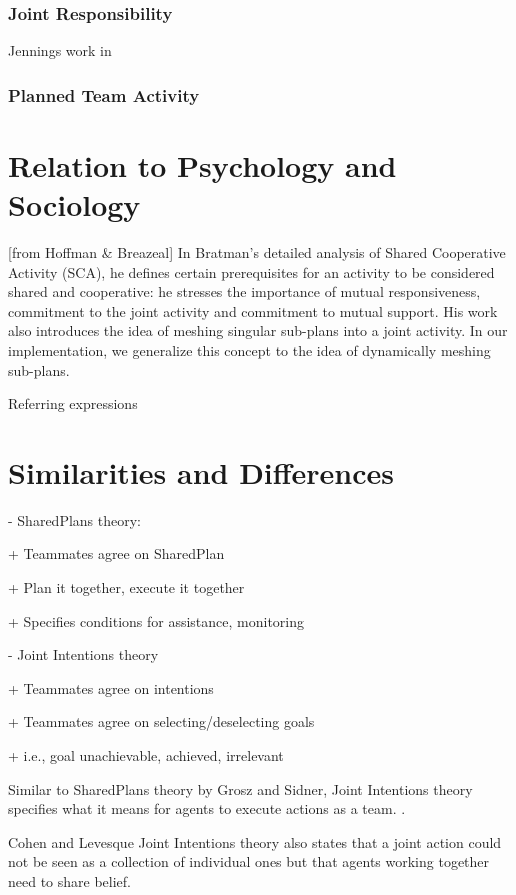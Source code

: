 \documentclass[11pt]{article}
\begin{document}
\subsubsection{Joint Responsibility}

Jennings work in \cite{jennings:joint-intention-hybrid}

\subsubsection{Planned Team Activity}

\section{Relation to Psychology and Sociology}

[from Hoffman \& Breazeal] In Bratman’s detailed analysis of Shared Cooperative
Activity (SCA), he defines certain prerequisites for an activity to be
considered shared and cooperative: he stresses the importance of mutual
responsiveness, commitment to the joint activity and commitment to mutual
support. His work also introduces the idea of meshing singular sub-plans into a
joint activity. In our implementation, we generalize this concept to the idea of
dynamically meshing sub-plans.

Referring expressions \cite{heeman:model-collaboration-referring}

\section{Similarities and Differences}

- SharedPlans theory:

+ Teammates agree on SharedPlan

+ Plan it together, execute it together

+ Specifies conditions for assistance, monitoring

- Joint Intentions theory

+ Teammates agree on intentions

+ Teammates agree on selecting/deselecting goals

+ i.e., goal unachievable, achieved, irrelevant

Similar to SharedPlans theory by Grosz and Sidner, Joint Intentions theory
specifies what it means for agents to execute actions as a team.
\cite{subramanian:joint-intention-dialogue}.

Cohen and Levesque Joint Intentions theory also states that a joint action could
not be seen as a collection of individual ones but that agents working together
need to share belief.
\end{document}

